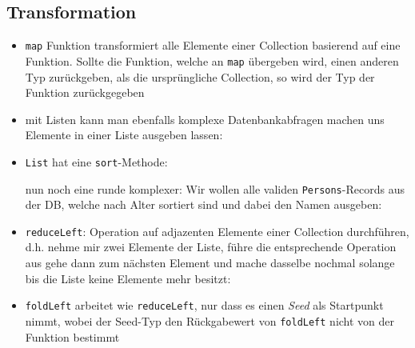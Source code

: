 

\subsection{Transformation}
\begin{itemize}
  \item \texttt{map} Funktion transformiert alle Elemente einer Collection
  basierend auf eine Funktion. Sollte die Funktion, welche an \texttt{map}
  übergeben wird, einen anderen Typ zurückgeben, als die ursprüngliche
  Collection, so wird der Typ der Funktion zurückgegeben
  
  
  
  \item mit Listen kann man ebenfalls komplexe Datenbankabfragen machen
  \und uns Elemente in einer Liste ausgeben lassen:
  
  
  
  \item \texttt{List} hat eine \texttt{sort}-Methode:
  
  
  
  nun noch eine runde komplexer: Wir wollen alle validen 
  \texttt{Persons}-Records aus der DB, welche nach Alter sortiert sind und
  dabei den Namen ausgeben:
  
  
  \item \texttt{reduceLeft}: Operation auf adjazenten Elemente einer
  Collection durchführen, d.h. nehme mir zwei Elemente der Liste, führe die
  entsprechende Operation aus \und gehe dann zum nächsten Element und mache
  dasselbe nochmal solange bis die Liste keine Elemente mehr besitzt:
  
  
  
  \item \texttt{foldLeft} arbeitet wie \texttt{reduceLeft}, nur dass es 
  einen \textit{Seed} als Startpunkt nimmt, wobei der Seed-Typ den Rückgabewert von \texttt{foldLeft} \und nicht von der Funktion bestimmt
  
  
  

\end{itemize}
